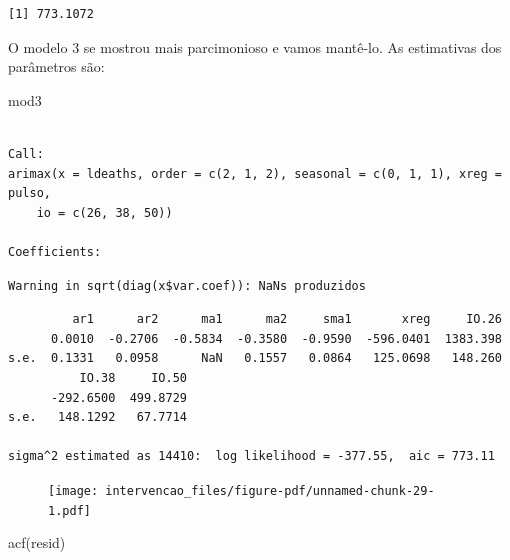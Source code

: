 \documentclass[
  letterpaper,
  DIV=11,
  numbers=noendperiod]{scrartcl}
\newenvironment{Shaded}{\begin{snugshade}}{\end{snugshade}}
\newcommand{\DecValTok}[1]{\textcolor[rgb]{0.68,0.00,0.00}{#1}}
\newcommand{\FunctionTok}[1]{\textcolor[rgb]{0.28,0.35,0.67}{#1}}
\newcommand{\NormalTok}[1]{\textcolor[rgb]{0.00,0.23,0.31}{#1}}
\newcommand{\OtherTok}[1]{\textcolor[rgb]{0.00,0.23,0.31}{#1}}
\newcommand{\SpecialCharTok}[1]{\textcolor[rgb]{0.37,0.37,0.37}{#1}}
\theoremstyle{plain}
\theoremstyle{plain}
\theoremstyle{definition}
\theoremstyle{definition}
\theoremstyle{remark}
\begin{document}
\begin{verbatim}
[1] 773.1072
\end{verbatim}

O modelo 3 se mostrou mais parcimonioso e vamos mantê-lo. As estimativas
dos parâmetros são:

\begin{Shaded}
\begin{Highlighting}[]
\NormalTok{mod3}
\end{Highlighting}
\end{Shaded}

\begin{verbatim}

Call:
arimax(x = ldeaths, order = c(2, 1, 2), seasonal = c(0, 1, 1), xreg = pulso, 
    io = c(26, 38, 50))

Coefficients:
\end{verbatim}

\begin{verbatim}
Warning in sqrt(diag(x$var.coef)): NaNs produzidos
\end{verbatim}

\begin{verbatim}
         ar1      ar2      ma1      ma2     sma1       xreg     IO.26
      0.0010  -0.2706  -0.5834  -0.3580  -0.9590  -596.0401  1383.398
s.e.  0.1331   0.0958      NaN   0.1557   0.0864   125.0698   148.260
          IO.38     IO.50
      -292.6500  499.8729
s.e.   148.1292   67.7714

sigma^2 estimated as 14410:  log likelihood = -377.55,  aic = 773.11
\end{verbatim}

\begin{Shaded}
\end{Shaded}

\begin{figure}[H]

{\centering \texttt{[image: intervencao\_files/figure-pdf/unnamed-chunk-29-1.pdf]}

}

\end{figure}

\begin{Shaded}
\begin{Highlighting}[]
\FunctionTok{acf}\NormalTok{(resid)}
\end{Highlighting}
\end{Shaded}
\end{document}
